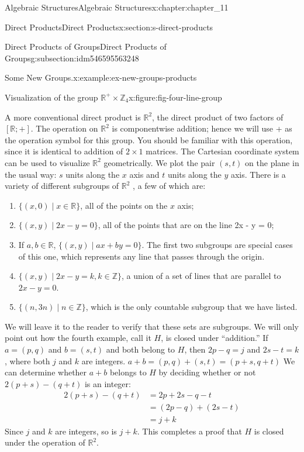 \documentclass[oneside,10pt,]{book}
\numberwithin{equation}{section}
\begin{document}
\begin{chapterptx}{Algebraic Structures}{}{Algebraic Structures}{}{}{x:chapter:chapter_11}
\begin{sectionptx}{Direct Products}{}{Direct Products}{}{}{x:section:s-direct-products}
\begin{subsectionptx}{Direct Products of Groups}{}{Direct Products of Groups}{}{}{g:subsection:idm546595563248}
\begin{example}{Some New Groups.}{x:example:ex-new-groups-products}
\begin{figureptx}{Visualization of the group \(\mathbb{R}^+ \times  \mathbb{Z}_4\)}{x:figure:fig-four-line-group}{}
\tcblower
\end{figureptx}%
\end{example}
A more conventional direct product is \(\mathbb{R}^2\), the direct product of two factors of \([\mathbb{R}; + ]\). The operation on \(\mathbb{R}^2\) is componentwise addition; hence we will use + as the operation symbol for this group. You should be familiar with this operation, since it is identical to addition of \(2 \times  1\) matrices. The Cartesian coordinate system can be used to visualize \(\mathbb{R}^2\) geometrically. We plot the pair \((s, t)\) on the plane in the usual way: \(s\) units along the \(x\) axis and \(t\) units along the \(y\) axis. There is a variety of different subgroups of \(\mathbb{R}^2\) , a few of which are:%
\begin{enumerate}[label=(\alph*)]
\item{}\(\{(x, 0) \mid x \in  \mathbb{R}\}\), all of the points on the \(x\) axis;%
\item{}\(\{(x, y) \mid 2x- y = 0\}\), all of the points that are on the line 2x - y = 0;%
\item{}If \(a, b \in  \mathbb{R}\), \(\{(x, y) \mid a x + b y = 0\}\).  The first two subgroups are special cases of this one, which represents any line that passes through the origin.%
\item{}\(\{(x, y) \mid 2x - y = k, k \in  \mathbb{Z}\}\), a union of a set of lines that are parallel to \(2x - y = 0\).%
\item{}\(\{(n, 3n) \mid n \in  \mathbb{Z}\}\), which is the only countable subgroup that we have listed.%
\end{enumerate}
%
\par
We will leave it to the reader to verify that these sets are subgroups. We will only point out how the fourth example, call it \(H\), is closed under ``addition.'' If \(a = (p, q)\) and \(b = (s, t)\) and both belong to \(H\), then \(2p - q = j\) and \(2s - t= k\), where both \(j\) and \(k\) are integers.  \(a + b = (p, q) + (s, t) = (p + s, q + t)\) We can determine whether \(a + b\) belongs to \(H\) by deciding whether or not \(2(p + s) - (q + t)\) is an integer:%
\begin{equation*}
\begin{split}
2(p + s) - (q + t) &= 2p + 2s - q - t\\
& = (2p - q) + (2s - t) \\
& = j + k
\end{split}
\end{equation*}
Since \(j\) and \(k\) are integers, so is \(j +k\). This completes a proof that \(H\) is closed under the operation of  \(\mathbb{R}^2\).%

\end{subsectionptx}
\end{sectionptx}
\end{chapterptx}
\end{document}
